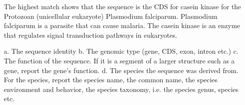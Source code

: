 \documentclass{acm_proc_article-sp}
\begin{document}
The highest match shows that the sequence is the CDS for casein kinase for the Protozoan (unicellular eukaryote) Plasmodium falciparum.  Plasmodium falciparum is a parasite that can cause malaria.  
The casein kinase is an enzyme that regulates signal transduction pathways in eukaryotes.  

a. The sequence identity
b. The genomic type (gene, CDS, exon, intron etc.)
c. The function of the sequence. If it is a segment of a larger structure such as a gene,
report the gene’s function.
d. The species the sequence was derived from. For the species, report the species name,
the common name, the species environment and behavior, the species taxonomy, i.e.
the species genus, species etc. 

%


%
%

\balancecolumns
\end{document}
